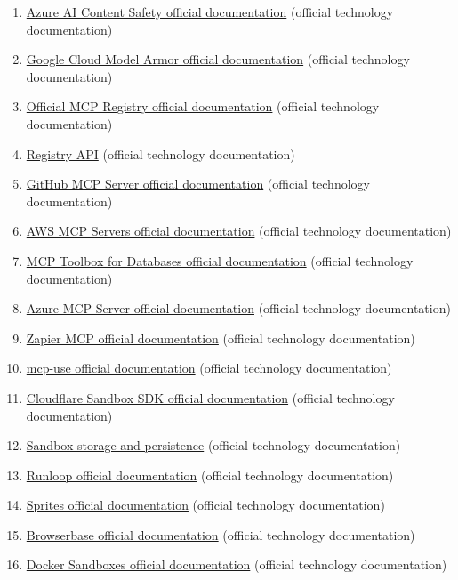 \begin{enumerate}
\item \href{https://learn.microsoft.com/en-us/azure/ai-services/content-safety/overview}{Azure AI Content Safety official documentation} (official technology documentation)
\item \href{https://cloud.google.com/security-command-center/docs/model-armor-overview}{Google Cloud Model Armor official documentation} (official technology documentation)
\item \href{https://modelcontextprotocol.io/registry/about}{Official MCP Registry official documentation} (official technology documentation)
\item \href{https://registry.modelcontextprotocol.io/docs}{Registry API} (official technology documentation)
\item \href{https://github.com/github/github-mcp-server}{GitHub MCP Server official documentation} (official technology documentation)
\item \href{https://github.com/awslabs/mcp}{AWS MCP Servers official documentation} (official technology documentation)
\item \href{https://googleapis.github.io/genai-toolbox/}{MCP Toolbox for Databases official documentation} (official technology documentation)
\item \href{https://github.com/microsoft/mcp}{Azure MCP Server official documentation} (official technology documentation)
\item \href{https://docs.zapier.com/mcp/home}{Zapier MCP official documentation} (official technology documentation)
\item \href{https://mcp-use.com/docs/}{mcp-use official documentation} (official technology documentation)
\item \href{https://developers.cloudflare.com/sandbox/}{Cloudflare Sandbox SDK official documentation} (official technology documentation)
\item \href{https://developers.cloudflare.com/sandbox/api/storage/}{Sandbox storage and persistence} (official technology documentation)
\item \href{https://docs.runloop.ai/}{Runloop official documentation} (official technology documentation)
\item \href{https://docs.sprites.dev/}{Sprites official documentation} (official technology documentation)
\item \href{https://docs.browserbase.com/}{Browserbase official documentation} (official technology documentation)
\item \href{https://docs.docker.com/ai/sandboxes/}{Docker Sandboxes official documentation} (official technology documentation)

\end{enumerate}
